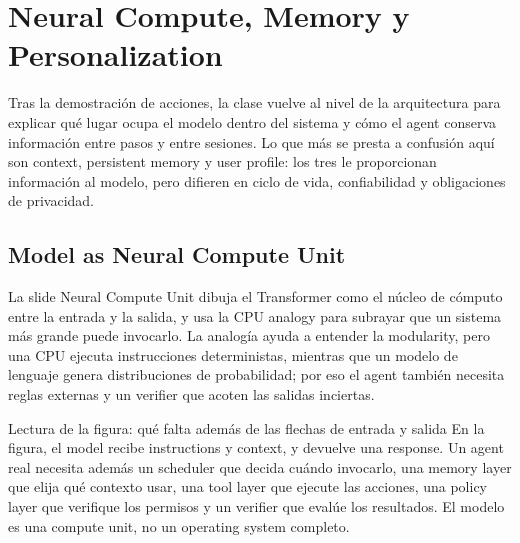 \section{Neural Compute, Memory y Personalization}

Tras la demostración de acciones, la clase vuelve al nivel de la arquitectura para explicar qué lugar ocupa el modelo dentro del sistema y cómo el agent conserva información entre pasos y entre sesiones. Lo que más se presta a confusión aquí son context, persistent memory y user profile: los tres le proporcionan información al modelo, pero difieren en ciclo de vida, confiabilidad y obligaciones de privacidad.

\subsection{Model as Neural Compute Unit}

La slide Neural Compute Unit dibuja el Transformer como el núcleo de cómputo entre la entrada y la salida, y usa la CPU analogy para subrayar que un sistema más grande puede invocarlo. La analogía ayuda a entender la modularity, pero una CPU ejecuta instrucciones deterministas, mientras que un modelo de lenguaje genera distribuciones de probabilidad; por eso el agent también necesita reglas externas y un verifier que acoten las salidas inciertas.


\begin{knowledgebox}{Lectura de la figura: qué falta además de las flechas de entrada y salida}
En la figura, el model recibe instructions y context, y devuelve una response. Un agent real necesita además un scheduler que decida cuándo invocarlo, una memory layer que elija qué contexto usar, una tool layer que ejecute las acciones, una policy layer que verifique los permisos y un verifier que evalúe los resultados. El modelo es una compute unit, no un operating system completo.
\end{knowledgebox}


